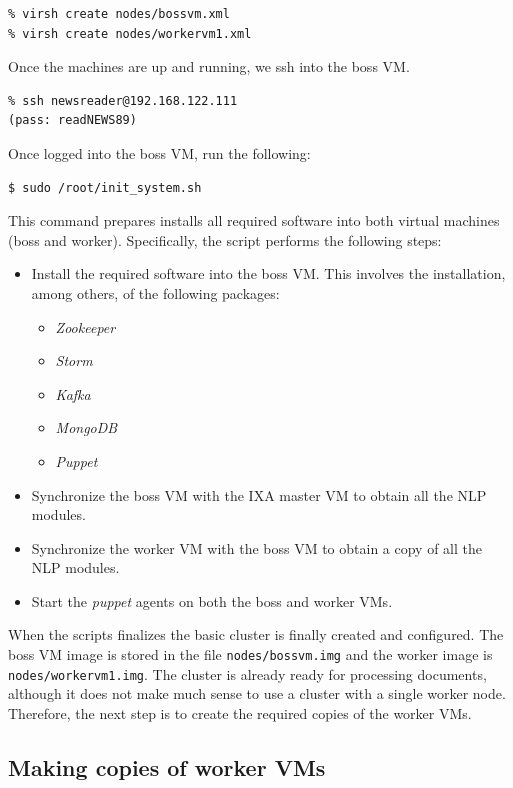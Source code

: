 \documentclass[a4]{article}
\begin{document}
\begin{verbatim}
% virsh create nodes/bossvm.xml
% virsh create nodes/workervm1.xml
\end{verbatim}

Once the machines are up and running, we ssh into the boss VM.

\begin{verbatim}
% ssh newsreader@192.168.122.111
(pass: readNEWS89)
\end{verbatim}

Once logged into the boss VM, run the following:

\begin{verbatim}
$ sudo /root/init_system.sh
\end{verbatim}

This command prepares installs all required software into both virtual
machines (boss and worker). Specifically, the script performs the following steps:
\begin{itemize}
\item Install the required software into the boss VM. This involves the
  installation, among others, of the following packages:
  \begin{itemize}
  \item \emph{Zookeeper}
  \item \emph{Storm}
  \item \emph{Kafka}
  \item \emph{MongoDB}
  \item \emph{Puppet}
  \end{itemize}
\item Synchronize the boss VM with the IXA master VM to obtain all the NLP
  modules.
\item Synchronize the worker VM with the boss VM to obtain a copy of all the
  NLP modules.
\item Start the \emph{puppet} agents on both the boss and worker VMs.
\end{itemize}

When the scripts finalizes the basic cluster is finally created and
configured. The boss VM image is stored in the file
\texttt{nodes/bossvm.img} and the worker image is
\texttt{nodes/workervm1.img}. The cluster is already ready for processing
documents, although it does not make much sense to use a cluster with a
single worker node. Therefore, the next step is to create the required
copies of the worker VMs.

\subsection{Making copies of worker VMs}
\label{sec:making-copies-worker}
\end{document}
